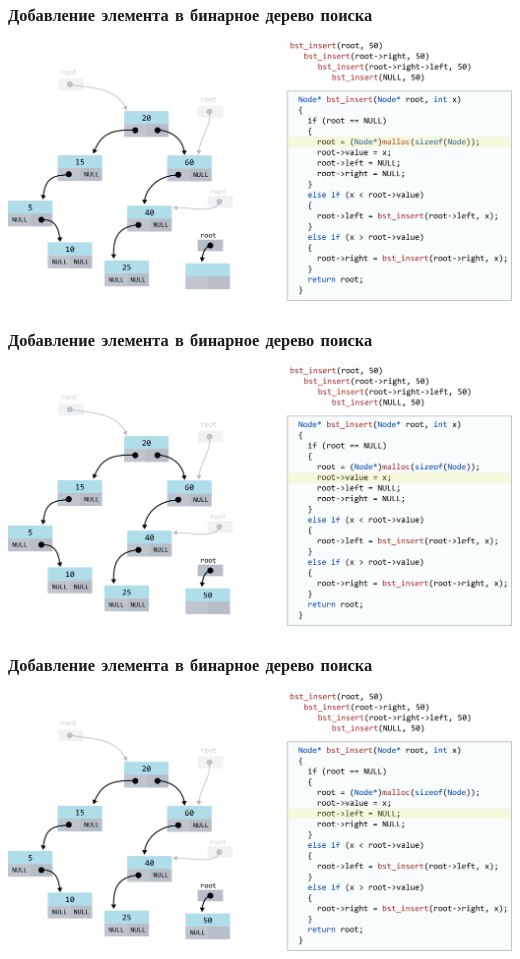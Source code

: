 \documentclass[10pt,pdf,hyperref={unicode}]{beamer}
\begin{document}
\begin{frame}[fragile]
\frametitle{Добавление элемента в бинарное дерево поиска}
\begin{center}
\includegraphics[width=\imageSizeMult\linewidth]{../images/codetree/codetree12.png}
\end{center}
\end{frame}

\begin{frame}[fragile]
\frametitle{Добавление элемента в бинарное дерево поиска}
\begin{center}
\includegraphics[width=\imageSizeMult\linewidth]{../images/codetree/codetree13.png}
\end{center}
\end{frame}

\begin{frame}[fragile]
\frametitle{Добавление элемента в бинарное дерево поиска}
\begin{center}
\includegraphics[width=\imageSizeMult\linewidth]{../images/codetree/codetree14.png}
\end{center}
\end{frame}
\end{document}
